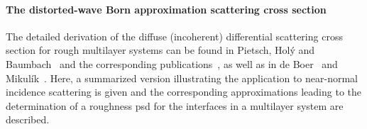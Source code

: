 \paragraph{The distorted-wave Born approximation scattering cross section}
The detailed derivation of the diffuse (incoherent) differential scattering cross section for rough multilayer systems can be found in Pietsch, Hol\'{y} and Baumbach~\cite{pietsch_high-resolution_2004} and the corresponding publications~\cite{sinha_x-ray_1988,holy_nonspecular_1994}, as well as in de Boer~\cite{de_boer_x-ray_1996} and Mikul\'{i}k~\cite{mikulik_x-ray_1997}. Here, a summarized version illustrating the application to near-normal incidence scattering is given and the corresponding approximations leading to the determination of a roughness \gls{psd} for the interfaces in a multilayer system are described.

